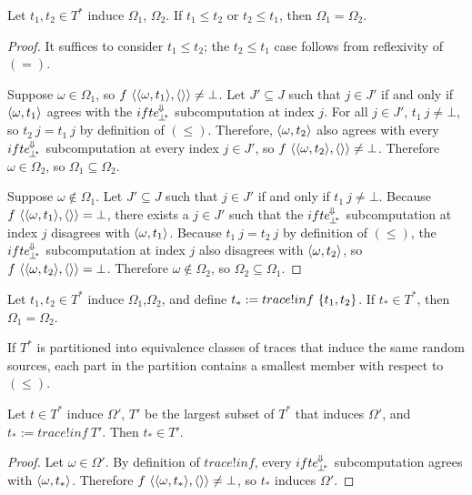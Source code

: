 \begin{theorem}
\label{thm:comparable-implies-same-sources}
Let $t_1,t_2 \in T^*$ induce $\Omega_1$, $\Omega_2$.
If $t_1 \leq t_2$ or $t_2 \leq t_1$, then $\Omega_1 = \Omega_2$.
\end{theorem}
\begin{proof}
It suffices to consider $t_1 \leq t_2$; the $t_2 \leq t_1$ case follows from reflexivity of $(=)$.

Suppose $\omega \in \Omega_1$, so $f~\langle{\langle{\omega,t_1}\rangle,\langle{}\rangle}\rangle \neq \bot$.
Let $J' \subseteq J$ such that $j \in J'$ if and only if $\langle{\omega,t_1}\rangle$ agrees with the $ifte^{\mspace{-2mu}\Downarrow\mspace{-2mu}}_{\mspace{-2mu}{\bot^{\mspace{-4mu}*}}}$ subcomputation at index $j$.
For all $j \in J'$, $t_1~j \neq \bot$, so $t_2~j = t_1~j$ by definition of $(\leq)$.
Therefore, $\langle{\omega,t_2}\rangle$ also agrees with every $ifte^{\mspace{-2mu}\Downarrow\mspace{-2mu}}_{\mspace{-2mu}{\bot^{\mspace{-4mu}*}}}$ subcomputation at every index $j \in J'$, so $f~\langle{\langle{\omega,t_2}\rangle,\langle{}\rangle}\rangle \neq \bot$.
Therefore $\omega \in \Omega_2$, so $\Omega_1 \subseteq \Omega_2$.

Suppose $\omega \notin \Omega_1$.
Let $J' \subseteq J$ such that $j \in J'$ if and only if $t_1~j \neq \bot$.
Because $f~\langle{\langle{\omega,t_1}\rangle,\langle{}\rangle}\rangle = \bot$, there exists a $j \in J'$ such that the $ifte^{\mspace{-2mu}\Downarrow\mspace{-2mu}}_{\mspace{-2mu}{\bot^{\mspace{-4mu}*}}}$ subcomputation at index $j$ disagrees with $\langle{\omega,t_1}\rangle$.
Because $t_1~j = t_2~j$ by definition of $(\leq)$, the $ifte^{\mspace{-2mu}\Downarrow\mspace{-2mu}}_{\mspace{-2mu}{\bot^{\mspace{-4mu}*}}}$ subcomputation at index $j$ also disagrees with $\langle{\omega,t_2}\rangle$, so $f~\langle{\langle{\omega,t_2}\rangle,\langle{}\rangle}\rangle = \bot$.
Therefore $\omega \notin \Omega_2$, so $\Omega_2 \subseteq \Omega_1$.
\end{proof}

\begin{corollary}
Let $t_1,t_2 \in T^*$ induce $\Omega_1$,$\Omega_2$, and define $t_* := trace!inf~\{{t_1,t_2}\}$.
If $t_* \in T^*$, then $\Omega_1 = \Omega_2$.
\end{corollary}

If $T^*$ is partitioned into equivalence classes of traces that induce the same random sources, each part in the partition contains a smallest member with respect to $(\leq)$.

\begin{theorem}
Let $t \in T^*$ induce $\Omega'$, $T'$ be the largest subset of $T^*$ that induces $\Omega'$, and $t_* := trace!inf~T'$.
Then $t_* \in T'$.
\end{theorem}
\begin{proof}
Let $\omega \in \Omega'$.
By definition of $trace!inf$, every $ifte^{\mspace{-2mu}\Downarrow\mspace{-2mu}}_{\mspace{-2mu}{\bot^{\mspace{-4mu}*}}}$ subcomputation agrees with $\langle{\omega,t_*}\rangle$.
Therefore $f~\langle{\langle{\omega,t_*}\rangle,\langle{}\rangle}\rangle \neq \bot$, so $t_*$ induces $\Omega'$.
\end{proof}

